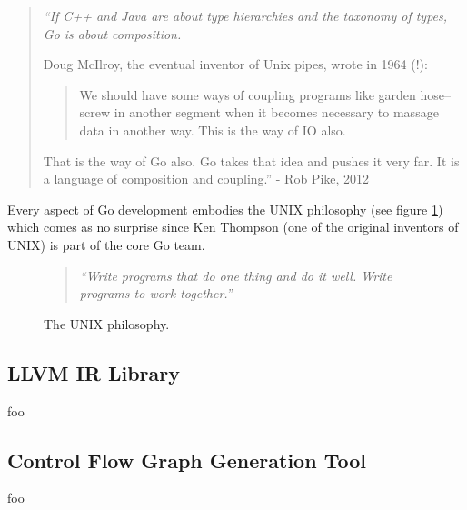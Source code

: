 \begin{quote}
	\itshape
	``If C++ and Java are about type hierarchies and the taxonomy of types, Go is about composition.

	Doug McIlroy, the eventual inventor of Unix pipes, wrote in 1964 (!):

	\begin{quote}
		We should have some ways of coupling programs like garden hose--screw in another segment when it becomes necessary to massage data in another way. This is the way of IO also.
	\end{quote}

	That is the way of Go also. Go takes that idea and pushes it very far. It is a language of composition and coupling.''
	\normalfont
	- Rob Pike, 2012 \cite{less_is_more}
\end{quote}

Every aspect of Go development embodies the UNIX philosophy (see figure \ref{unix_philosophy}) which comes as no surprise since Ken Thompson (one of the original inventors of UNIX) is part of the core Go team.

\begin{figure}[htbp]
	\begin{center}
		\begin{quote}
			\textit{``Write programs that do one thing and do it well. Write programs to work together.''} \cite{art_of_unix}
		\end{quote}
		\caption{The UNIX philosophy.}
		\label{unix_philosophy}
	\end{center}
\end{figure}


\subsection{LLVM IR Library}

foo


\subsection{Control Flow Graph Generation Tool}

foo


